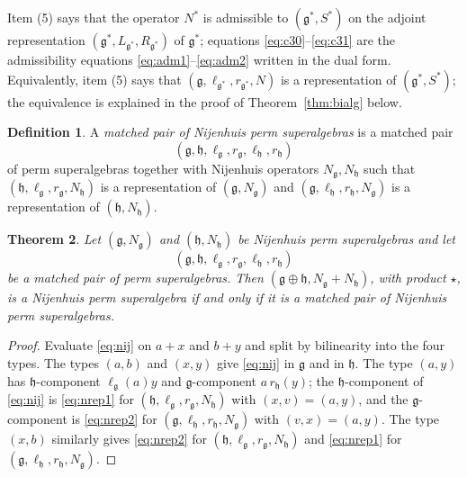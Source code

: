 \documentclass[11pt]{article}
\newtheorem{theorem}{Theorem}[section]
\theoremstyle{definition}
\newtheorem{definition}[theorem]{Definition}
\newcommand{\g}{\mathfrak{g}}
\newcommand{\h}{\mathfrak{h}}
\begin{document}
Item (5) says that the operator $N^*$ is admissible to $(\g^*,S^*)$ on the adjoint representation $(\g^*,L_{\g^*},R_{\g^*})$ of $\g^*$; equations \eqref{eq:c30}--\eqref{eq:c31} are the admissibility equations \eqref{eq:adm1}--\eqref{eq:adm2} written in the dual form. Equivalently, item (5) says that $(\g,\ell_{\g^*},r_{\g^*},N)$ is a representation of $(\g^*,S^*)$; the equivalence is explained in the proof of Theorem~\ref{thm:bialg} below.

\begin{definition}\label{def:matchedN}
A \emph{matched pair of Nijenhuis perm superalgebras} is a matched pair
\[
(\g,\h,\ell_\g,r_\g,\ell_\h,r_\h)
\]
of perm superalgebras together with Nijenhuis operators $N_\g,N_\h$ such that $(\h,\ell_\g,r_\g,N_\h)$ is a representation of $(\g,N_\g)$ and $(\g,\ell_\h,r_\h,N_\g)$ is a representation of $(\h,N_\h)$.
\end{definition}

\begin{theorem}\label{thm:matched}
Let $(\g,N_\g)$ and $(\h,N_\h)$ be Nijenhuis perm superalgebras and let
\[
(\g,\h,\ell_\g,r_\g,\ell_\h,r_\h)
\]
be a matched pair of perm superalgebras. Then $(\g\oplus\h,N_\g+N_\h)$, with product $\star$, is a Nijenhuis perm superalgebra if and only if it is a matched pair of Nijenhuis perm superalgebras.
\end{theorem}
\begin{proof}
Evaluate \eqref{eq:nij} on $a+x$ and $b+y$ and split by bilinearity into the four types. The types $(a,b)$ and $(x,y)$ give \eqref{eq:nij} in $\g$ and in $\h$. The type $(a,y)$ has $\h$-component $\ell_\g(a)y$ and $\g$-component $a\,r_\h(y)$; the $\h$-component of \eqref{eq:nij} is \eqref{eq:nrep1} for $(\h,\ell_\g,r_\g,N_\h)$ with $(x,v)=(a,y)$, and the $\g$-component is \eqref{eq:nrep2} for $(\g,\ell_\h,r_\h,N_\g)$ with $(v,x)=(a,y)$. The type $(x,b)$ similarly gives \eqref{eq:nrep2} for $(\h,\ell_\g,r_\g,N_\h)$ and \eqref{eq:nrep1} for $(\g,\ell_\h,r_\h,N_\g)$.
\end{proof}
\end{document}
